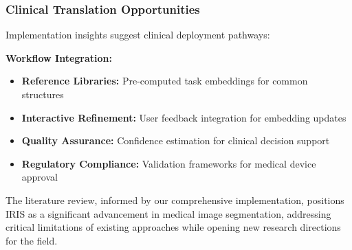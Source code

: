 \subsubsection*{Clinical Translation Opportunities}
Implementation insights suggest clinical deployment pathways:

\textbf{Workflow Integration:}
\begin{itemize}
    \item \textbf{Reference Libraries:} Pre-computed task embeddings for common structures
    \item \textbf{Interactive Refinement:} User feedback integration for embedding updates
    \item \textbf{Quality Assurance:} Confidence estimation for clinical decision support
    \item \textbf{Regulatory Compliance:} Validation frameworks for medical device approval
\end{itemize}

The literature review, informed by our comprehensive implementation, positions IRIS as a significant advancement in medical image segmentation, addressing critical limitations of existing approaches while opening new research directions for the field.

